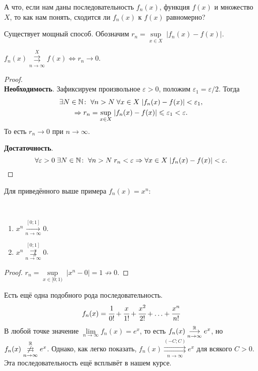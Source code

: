 \documentclass[a4paper, 12pt]{article}
\begin{document}
	А что, если нам даны последовательность $f_n(x)$, функция $f(x)$ и множество $X$, то как нам понять, сходится ли $f_n(x)$ к $f(x)$ равномерно?
	
	Существует мощный способ. Обозначим $r_n =\underset{x \in X}{\sup}\;|f_n(x) - f(x)|$.
	\begin{Statement}
		$f_n(x)\overset{X}{\underset{n\to\infty}{\rightrightarrows}} f(x) \Leftrightarrow r_n\to 0$.
	\end{Statement}
	\begin{proof}\ \\
		\textbf{Необходимость}. Зафиксируем произвольное $\varepsilon > 0$, положим $\varepsilon_1 = \varepsilon/2$. Тогда
		\begin{gather*}
			\exists N\in \mathbb{N} \colon\; \forall n>N\; \forall x \in X\; |f_n(x) - f(x)| < \varepsilon_1,\\
			\Rightarrow r_n =  \underset{x \in X}{\sup}\; |f_n(x) - f(x)| \leqslant \varepsilon_1 < \varepsilon.
		\end{gather*}
		То есть $r_n \to 0$ при $n\to \infty$.
		\par \textbf{Достаточность}.
		$$
		\forall \varepsilon > 0\; \exists N \in \mathbb{N}\colon \; \forall n>N\; r_n < \varepsilon \Rightarrow \forall x \in X\; |f_n(x) - f(x)| < \varepsilon.
		$$
	\end{proof}
	Для приведённого выше примера $f_n(x) = x^n$:
	\begin{Statement}\ \\		
		\begin{enumerate}
			\item $x^n \overset{[0;1]}{\underset{n\to\infty}{\longrightarrow}} 0$.
			\item $x^n \overset{[0;1]}{\underset{n\to\infty}{\not\rightrightarrows}} 0$.
		\end{enumerate}
	\end{Statement}
	\begin{proof}
		$r_n = \underset{x\in[0;1)}{\sup}\;|x^n - 0| = 1 \not\to 0$.
	\end{proof}
	Есть ещё одна подобного рода последовательность.
	$$
		f_n(x) = \cfrac{1}{0!} + \cfrac{x}{1!} + \cfrac{x^2}{2!} + \ldots + \cfrac{x^n}{n!}
	$$
	В любой точке значение $\lim\limits_{n \to \infty} f_n(x) = e^x$, то есть 	$f_n(x) \overset{\mathbb{R}}{\underset{n\to\infty}{\longrightarrow}} e^x$, но $f_n(x) \overset{\mathbb{R}}{\underset{n\to\infty}{\not\rightrightarrows}} e^x$. Однако, как легко показать, $f_n(x) \overset{(-C;C)}{\underset{n\to\infty}{\rightrightarrows}} e^x$ для всякого $C>0$. Эта последовательность ещё всплывёт в нашем курсе.
\end{document}
